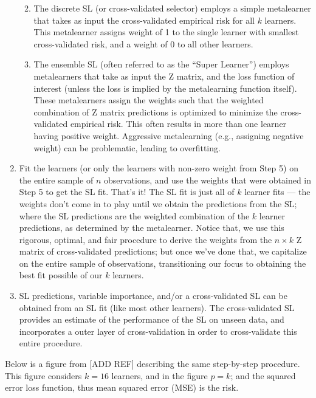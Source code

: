 \documentclass[12pt, krantz2,]{krantz}
\providecommand{\tightlist}{%
  \setlength{\itemsep}{0pt}\setlength{\parskip}{0pt}}
\theoremstyle{definition}
\theoremstyle{definition}
\theoremstyle{definition}
\newcommand{\1}{\mathbbm{1}}
\begin{document}
\begin{enumerate}
  \begin{enumerate}
  \def\labelenumii{\alph{enumii}.}
  \tightlist
  \item
    The discrete SL (or cross-validated selector) employs a simple
    metalearner that takes as input the cross-validated empirical risk for
    all \(k\) learners. This metalearner assigns weight of 1 to the single
    learner with smallest cross-validated risk, and a weight of 0 to all
    other learners.
  \item
    The ensemble SL (often referred to as the ``Super Learner'') employs
    metalearners that take as input the Z matrix, and the loss function of
    interest (unless the loss is implied by the metalearning function
    itself). These metalearners assign the weights such that the weighted
    combination of Z matrix predictions is optimized to minimize the
    cross-validated empirical risk. This often results in more than one
    learner having positive weight. Aggressive metalearning (e.g., assigning
    negative weight) can be problematic, leading to overfitting.
  \end{enumerate}
\item
  Fit the learners (or only the learners with non-zero weight from Step 5)
  on the entire sample of \(n\) observations, and use the weights that were
  obtained in Step 5 to get the SL fit. That's it! The SL fit is just all of
  \(k\) learner fits --- the weights don't come in to play until we obtain the
  predictions from the SL; where the SL predictions are the weighted
  combination of the \(k\) learner predictions, as determined by the
  metalearner. Notice that, we use this rigorous, optimal, and fair procedure
  to derive the weights from the \(n \times k\) Z matrix of cross-validated
  predictions; but once we've done that, we capitalize on the entire sample
  of observations, transitioning our focus to obtaining the best fit possible
  of our \(k\) learners.
\item
  SL predictions, variable importance, and/or a cross-validated SL can be
  obtained from an SL fit (like most other learners). The cross-validated SL
  provides an estimate of the performance of the SL on unseen data, and
  incorporates a outer layer of cross-validation in order to cross-validate
  this entire procedure.
\end{enumerate}

Below is a figure from {[}ADD REF{]} describing the same step-by-step procedure.
This figure considers \(k=16\) learners, and in the figure \(p=k\); and the squared
error loss function, thus mean squared error (MSE) is the risk.
\end{document}
